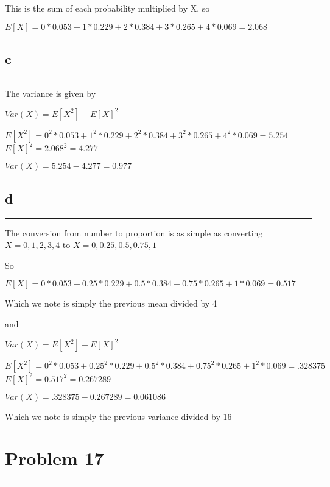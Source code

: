 \documentclass[]{tufte-handout}
\begin{document}
This is the sum of each probability multiplied by X, so

\(E[X] = 0*0.053 + 1*0.229 + 2*0.384 + 3*0.265 + 4*0.069 = 2.068\)

\hypertarget{c-2}{%
\subsection{c}\label{c-2}}

\begin{center}\rule{0.5\linewidth}{0.5pt}\end{center}

The variance is given by

\(Var(X) = E[X^2] - E[X]^2\)

\(E[X^2] = 0^2*0.053 + 1^2*0.229 + 2^2*0.384 + 3^2*0.265 + 4^2*0.069 = 5.254\)
\(E[X]^2 = 2.068^2 = 4.277\)

\(Var(X) = 5.254 - 4.277 = 0.977\)

\hypertarget{d}{%
\subsection{d}\label{d}}

\begin{center}\rule{0.5\linewidth}{0.5pt}\end{center}

The conversion from number to proportion is as simple as converting
\(X = 0, 1, 2, 3, 4\) to \(X = 0, 0.25, 0.5, 0.75, 1\)

So

\(E[X] = 0*0.053 + 0.25*0.229 + 0.5*0.384 + 0.75*0.265 + 1*0.069 = 0.517\)

Which we note is simply the previous mean divided by 4

and

\(Var(X) = E[X^2] - E[X]^2\)

\(E[X^2] = 0^2*0.053 + 0.25^2*0.229 + 0.5^2*0.384 + 0.75^2*0.265 + 1^2*0.069 = .328375\)
\(E[X]^2 = 0.517^2 = 0.267289\)

\(Var(X) = .328375 - 0.267289 = 0.061086\)

Which we note is simply the previous variance divided by 16

\hypertarget{problem-17}{%
\section{Problem 17}\label{problem-17}}

\begin{center}\rule{0.5\linewidth}{0.5pt}\end{center}
\end{document}
